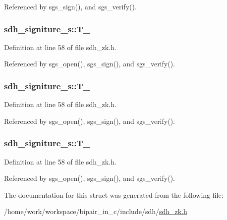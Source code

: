 Referenced by sgs\-\_\-sign(), and sgs\-\_\-verify().

\hypertarget{structsdh__signiture__s_aef45e7434100d23b8524adc8ff9029ac}{
\subsubsection[{T\-\_\-1}]{ sdh\-\_\-signiture\-\_\-s\-::\-T\-\_}}\label{structsdh__signiture__s_aef45e7434100d23b8524adc8ff9029ac}


Definition at line 58 of file sdh\-\_\-zk.\-h.



Referenced by sgs\-\_\-open(), sgs\-\_\-sign(), and sgs\-\_\-verify().

\hypertarget{structsdh__signiture__s_aa65d15c0c542386b6cca20c860925bb7}{
\subsubsection[{T\-\_\-2}]{ sdh\-\_\-signiture\-\_\-s\-::\-T\-\_}}\label{structsdh__signiture__s_aa65d15c0c542386b6cca20c860925bb7}


Definition at line 58 of file sdh\-\_\-zk.\-h.



Referenced by sgs\-\_\-open(), sgs\-\_\-sign(), and sgs\-\_\-verify().

\hypertarget{structsdh__signiture__s_a7603580595713865bcb5d995d491bb86}{
\subsubsection[{T\-\_\-3}]{ sdh\-\_\-signiture\-\_\-s\-::\-T\-\_}}\label{structsdh__signiture__s_a7603580595713865bcb5d995d491bb86}


Definition at line 58 of file sdh\-\_\-zk.\-h.



Referenced by sgs\-\_\-open(), sgs\-\_\-sign(), and sgs\-\_\-verify().



The documentation for this struct was generated from the following file\-:\begin{DoxyCompactItemize}
\item 
/home/work/workspace/bipair\-\_\-in\-\_\-c/include/sdh/\hyperlink{sdh__zk_8h}{sdh\-\_\-zk.\-h}\end{DoxyCompactItemize}
